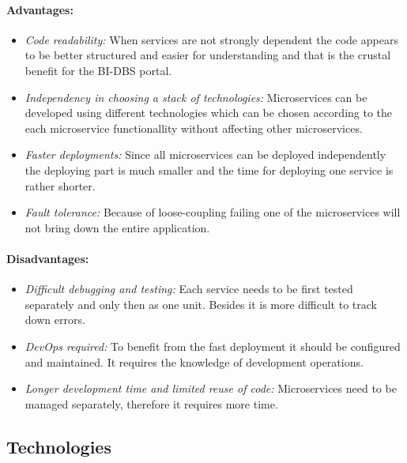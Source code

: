 \paragraph*{Advantages:}
\begin{itemize}
  \item \emph{Code readability:} When services are not strongly dependent the code appears to be better structured and easier for understanding and that is the crustal benefit for the BI-DBS portal.
  
  \item \emph{Independency in choosing a stack of technologies:} Microservices can be developed using different technologies which can be chosen according to the each microservice functionallity without affecting other microservices.
  
  \item \emph{Faster deployments:} Since all microservices can be deployed independently the deploying part is much smaller and the time for deploying one service is rather shorter.

  \item \emph{Fault tolerance:} Because of loose-coupling failing one of the microservices will not bring down the entire application.
\end{itemize}

\paragraph*{Disadvantages:}
\begin{itemize}
  \item \emph{Difficult debugging and testing:} Each service needs to be first tested separately and only then as one unit. Besides it is more difficult to track down errors.

  \item \emph{DevOps required:} To benefit from the fast deployment it should be configured and maintained. It requires the knowledge of development operations.

  \item \emph{Longer development time and limited reuse of code:} Microservices need to be managed separately, therefore it requires more time.
\end{itemize}



\subsection{Technologies}

